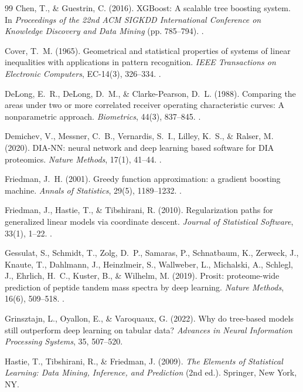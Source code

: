 \documentclass[11pt,oneside]{book}
\begin{document}
\begin{thebibliography}{99}
Chen, T., \& Guestrin, C. (2016). XGBoost: A scalable tree boosting system. In \textit{Proceedings of the 22nd ACM SIGKDD International Conference on Knowledge Discovery and Data Mining} (pp. 785--794). .

Cover, T.~M. (1965). Geometrical and statistical properties of systems of linear inequalities with applications in pattern recognition. \textit{IEEE Transactions on Electronic Computers}, EC-14(3), 326--334. .

DeLong, E.~R., DeLong, D.~M., \& Clarke-Pearson, D.~L. (1988). Comparing the areas under two or more correlated receiver operating characteristic curves: A nonparametric approach. \textit{Biometrics}, 44(3), 837--845. .

Demichev, V., Messner, C.~B., Vernardis, S.~I., Lilley, K.~S., \& Ralser, M. (2020). DIA-NN: neural network and deep learning based software for DIA proteomics. \textit{Nature Methods}, 17(1), 41--44. .

Friedman, J.~H. (2001). Greedy function approximation: a gradient boosting machine. \textit{Annals of Statistics}, 29(5), 1189--1232. .

Friedman, J., Hastie, T., \& Tibshirani, R. (2010). Regularization paths for generalized linear models via coordinate descent. \textit{Journal of Statistical Software}, 33(1), 1--22. .

Gessulat, S., Schmidt, T., Zolg, D.~P., Samaras, P., Schnatbaum, K., Zerweck, J., Knaute, T., Dahlmann, J., Heinzlmeir, S., Wallweber, L., Michalski, A., Schlegl, J., Ehrlich, H.~C., Kuster, B., \& Wilhelm, M. (2019). Prosit: proteome-wide prediction of peptide tandem mass spectra by deep learning. \textit{Nature Methods}, 16(6), 509--518. .

Grinsztajn, L., Oyallon, E., \& Varoquaux, G. (2022). Why do tree-based models still outperform deep learning on tabular data? \textit{Advances in Neural Information Processing Systems}, 35, 507--520.

Hastie, T., Tibshirani, R., \& Friedman, J. (2009). \textit{The Elements of Statistical Learning: Data Mining, Inference, and Prediction} (2nd ed.). Springer, New York, NY.


\end{thebibliography}
\end{document}

